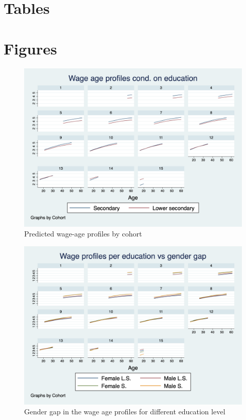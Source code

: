 \documentclass[12pt]{article}
\begin{document}
\section{Tables}
\begin{center}
    
    
    
    
    
    
    
\end{center}
\newpage

\section{Figures}

\begin{figure}
    \centering
    \includegraphics[scale=0.4]{graph1.png}
    \caption{\label{fig:pred_reg}Predicted wage-age profiles by cohort}
    
\end{figure}
\begin{figure}
    \centering
    \includegraphics[scale=0.4]{graph2.png}
    \caption{\label{fig:w_gend_l}Gender gap in the wage age profiles for different education level}
    
\end{figure}
\end{document}
